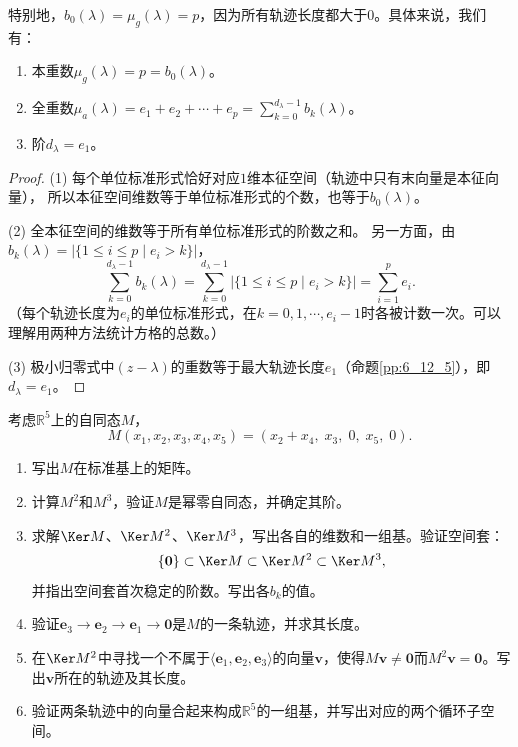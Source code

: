 \documentclass[12pt,UTF8]{ctexbook}
\begin{document}
特别地，$b_0(\lambda) = \mu_g(\lambda) = p$，因为所有轨迹长度都大于$0$。具体来说，我们有：
\begin{enumerate}
\item 本重数$\mu_g(\lambda) = p = b_0(\lambda)$。
\item 全重数$\mu_a(\lambda) = e_1 + e_2 + \cdots + e_p = \sum_{k=0}^{d_\lambda - 1} b_k(\lambda)$。
\item 阶$d_\lambda = e_1$。
\end{enumerate}
\begin{proof}
(1) 每个单位标准形式恰好对应$1$维本征空间（轨迹中只有末向量是本征向量），
所以本征空间维数等于单位标准形式的个数，也等于$b_0(\lambda)$。

(2) 全本征空间的维数等于所有单位标准形式的阶数之和。
另一方面，由$b_k(\lambda) = \left|\{1\leqslant i \leqslant p\mid e_i > k\}\right|$，
$$ \sum_{k=0}^{d_\lambda - 1} b_k(\lambda) = \sum_{k=0}^{d_\lambda - 1} \left|\{1\leqslant i \leqslant p\mid e_i > k\}\right| = \sum_{i=1}^p e_i. $$
（每个轨迹长度为$e_i$的单位标准形式，在$k = 0, 1, \cdots, e_i - 1$时各被计数一次。可以理解用两种方法统计方格的总数。）

(3) 极小归零式中$(z - \lambda)$的重数等于最大轨迹长度$e_1$（命题\ref{pp:6_12_5}），即$d_\lambda = e_1$。
\end{proof}

\begin{et}\label{et:6_nilpotent}
考虑$\mathbb{R}^5$上的自同态$M$，
$$M(x_1, x_2, x_3, x_4, x_5) = (x_2 + x_4,\; x_3,\; 0,\; x_5,\; 0).$$
\begin{enumerate}
\item 写出$M$在标准基上的矩阵。
\item 计算$M^2$和$M^3$，验证$M$是幂零自同态，并确定其阶。
\item 求解$\Ker M$、$\Ker M^2$、$\Ker M^3$，写出各自的维数和一组基。验证空间套：
$$\{\mathbf{0}\} \subset \Ker M \subset \Ker M^2 \subset \Ker M^3,$$
并指出空间套首次稳定的阶数。写出各$b_k$的值。
\item 验证$\mathbf{e}_3 \to \mathbf{e}_2 \to \mathbf{e}_1 \to \mathbf{0}$是$M$的一条轨迹，并求其长度。
\item 在$\Ker M^2$中寻找一个不属于$\langle \mathbf{e}_1, \mathbf{e}_2, \mathbf{e}_3\rangle$的向量$\mathbf{v}$，使得$M\mathbf{v} \neq \mathbf{0}$而$M^2\mathbf{v} = \mathbf{0}$。写出$\mathbf{v}$所在的轨迹及其长度。
\item 验证两条轨迹中的向量合起来构成$\mathbb{R}^5$的一组基，并写出对应的两个循环子空间。
\end{enumerate}
\end{et}
\end{document}
